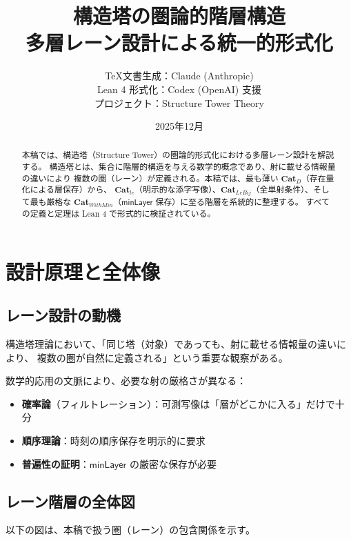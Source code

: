 \documentclass[a4paper,11pt]{ltjsarticle}
\title{%
  \textbf{構造塔の圏論的階層構造}\\[0.5em]
  \Large 多層レーン設計による統一的形式化
}
\author{%
  \TeX 文書生成：Claude (Anthropic)\\
  Lean 4 形式化：Codex (OpenAI) 支援\\[0.5em]
  \small プロジェクト：Structure Tower Theory
}
\date{2025年12月}
\theoremstyle{definition}
\theoremstyle{plain}
\newcommand{\CatD}{\mathbf{Cat}_D}
\newcommand{\Catle}{\mathbf{Cat}_{le}}
\newcommand{\CatLeBij}{\mathbf{Cat}_{LeBij}}
\newcommand{\CatWithMin}{\mathbf{Cat}_{WithMin}}
\newcommand{\minLayer}{\mathsf{minLayer}}
\begin{document}
\maketitle

\begin{abstract}
本稿では、構造塔（Structure Tower）の圏論的形式化における多層レーン設計を解説する。
構造塔とは、集合に階層的構造を与える数学的概念であり、射に載せる情報量の違いにより
複数の圏（レーン）が定義される。本稿では、最も薄い $\CatD$（存在量化による層保存）から、
$\Catle$（明示的な添字写像）、$\CatLeBij$（全単射条件）、そして最も厳格な
$\CatWithMin$（$\minLayer$ 保存）に至る階層を系統的に整理する。
すべての定義と定理は Lean 4 で形式的に検証されている。
\end{abstract}

\tableofcontents
\newpage

\section{設計原理と全体像}

\subsection{レーン設計の動機}

構造塔理論において、「同じ塔（対象）であっても、射に載せる情報量の違いにより、
複数の圏が自然に定義される」という重要な観察がある。

\begin{keypoint}
数学的応用の文脈により、必要な射の厳格さが異なる：
\begin{itemize}
  \item \textbf{確率論}（フィルトレーション）：可測写像は「層がどこかに入る」だけで十分
  \item \textbf{順序理論}：時刻の順序保存を明示的に要求
  \item \textbf{普遍性の証明}：$\minLayer$ の厳密な保存が必要
\end{itemize}
\end{keypoint}

\subsection{レーン階層の全体図}

以下の図は、本稿で扱う圏（レーン）の包含関係を示す。
\end{document}

